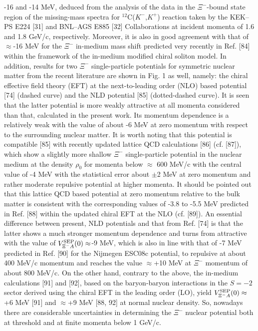 \documentclass[12pt]{article}
\begin{document}
-16 and -14 MeV, deduced from the analysis of the data in the $\Xi^-$-bound state region of the missing-mass
spectra for $^{12}$C($K^-$,$K^+$) reaction taken by the KEK--PS E224 [31] and BNL--AGS E885 [32] Collaborations
at incident momenta of 1.6 and 1.8 GeV/c, respectively. Moreover, it is also in good agreement with that of
$\approx$-16 MeV for the $\Xi^-$ in-medium mass shift predicted very recently in Ref. [84] within the framework
of the in-medium modified chiral soliton model. In addition, results for two $\Xi^-$ single-particle potentials
for symmetric nuclear matter from the recent literature are shown in Fig. 1 as well, namely: the chiral effective
field theory (EFT) at the next-to-leading order (NLO) based potential [74] (dashed curve) and the
NLD potential [85] (dotted-dashed curve). It is seen that the latter potential is more weakly attractive at all
momenta considered than that, calculated in the present work. Its momentum dependence is a relatively weak with
the value of about -6 MeV at zero momentum with respect to the surrounding nuclear matter. It is worth
noting that this potential is compatible [85] with recently updated lattice QCD calculations [86] (cf. [87]),
which show a slightly more shallow $\Xi^-$ single-particle potential in the nuclear medium at the density
$\rho_0$ for momenta below $\approx$ 600 MeV/c with the central value of -4 MeV with the statistical error
about $\pm$2 MeV at zero momentum and rather moderate repulsive potential at higher momenta.
It should be pointed out that
this lattice QCD based potential at zero momentum relative to the bulk matter is consistent with the
corresponding values of -3.8 to -5.5 MeV predicted in Ref. [88] within the updated chiral
EFT at the NLO (cf. [89]). An essential difference between present, NLD
potentials and that from Ref. [74] is that the latter shows a much stronger momentum dependence and turns from
attractive with the value of $V_{{\Xi^-}A}^{\rm SEP}(0)\approx$-9 MeV, which is also in line with that of -7 MeV
predicted in Ref. [90] for the Nijmegen ESC08c potential, to repulsive at about 400 MeV/c momentum
and reaches the value $\approx$+10 MeV at $\Xi^-$ momentum of about 800 MeV/c. On the other hand, contrary to
the above, the in-medium calculations [91] and [92], based on the baryon-baryon interactions in the $S=-2$ sector
derived using the chiral EFT in the leading order (LO), yield $V_{{\Xi^-}A}^{\rm SEP}(0)\approx$+6 MeV [91]
and $\approx$+9 MeV [88, 92] at normal nuclear density. So, nowadays there are considerable
uncertainties in determining the $\Xi^-$ nuclear potential both at threshold and at finite momenta below 1 GeV/c.
\end{document}
